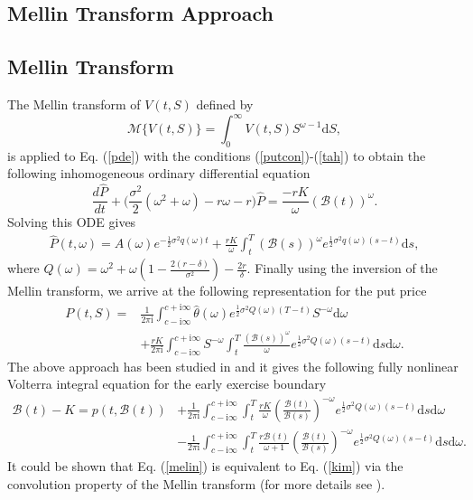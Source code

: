 \documentclass[fleqn,final,3p,11pt]{elsarticle}
\theoremstyle{definition}
\theoremstyle{remark}
\numberwithin{equation}{section}
\def\im{\mathrm{i}}
\begin{document}
\begin{appendices}
\section{Mellin Transform Approach}\label{melina}
\subsection{Mellin Transform}The Mellin transform of $V(t,S)$ defined by
\[\mathcal{M}\{V(t, S)\} = \int_{0}^{\infty} V(t, S)S^{\omega -1}\mathrm{d}S,\]
is applied to Eq. (\ref{pde}) with the conditions (\ref{putcon})-(\ref{tah}) to obtain the following inhomogeneous ordinary differential equation
\[
\frac{d\widehat{P}}{dt} + \Big( \frac{\sigma^2}{2}(\omega^{2}+\omega)-r\omega -r \Big)\widehat{P} = \frac{-rK}{\omega}(\mathcal{B}(t))^{\omega}.
\]
Solving this ODE gives
\begin{align*}
\widehat{P}(t, \omega) =A(\omega)e^{-\frac{1}{2}\sigma^{2}q(\omega)t} +\frac{rK}{\omega}\int_{t}^{T}(\mathcal{B}(s))^{\omega}e^{\frac{1}{2}\sigma^{2}q(\omega)(s-t)}\mathrm{d}s,
\end{align*}
where $Q(\omega) = \omega^{2} + \omega  \left( 1- \frac{2(r-\delta)}{\sigma^{2}}\right) - \frac{2r}{\delta}$.
Finally using the inversion of the Mellin transform, we arrive at the following representation for the  put price
\begin{align*}
P(t,S) =& \frac{1}{2\pi \im}\int_{c-\im \infty}^{c+\im \infty} \widehat{\theta}(\omega) e^{\frac{1}{2}\sigma^{2} Q(\omega)(T-t)} S^{-\omega}\mathrm{d}\omega \\
&+ \frac{rK}{2\pi \im}\int_{c-\im \infty}^{c+\im\infty} S^{-\omega} \int_{t}^{T}\frac{(\mathcal{B}(s))^{\omega}}{\omega}e^{\frac{1}{2}\sigma^{2}Q(\omega)(s-t)}\mathrm{d}s\mathrm{d}\omega.
\end{align*}
The above approach has been studied in \cite{frontczak2008pricing, panini} and it gives the following fully nonlinear Volterra integral equation for the early exercise boundary
\begin{equation}\label{melin}
\begin{split}
\mathcal{B}(t) - K  = p(t,\mathcal{B}(t)) & + \frac{1}{2\pi \im}\int_{c- \im \infty}^{c+\im \infty}\int_{t}^{T} \frac{r K}{\omega} \left(  \frac{\mathcal{B}(t)}{\mathcal{B}(s)} \right) ^{-\omega} e^{\frac{1}{2} \sigma^{2}Q(\omega)(s-t)} \mathrm{d}s \mathrm{d}\omega\\
& -  \frac{1}{2\pi \im}\int_{c-\im \infty}^{c+\im \infty}\int_{t}^{T} \frac{r \mathcal{B}(t)}{\omega +1} \left(  \frac{\mathcal{B}(t)}{\mathcal{B}(s)} \right) ^{-\omega} e^{\frac{1}{2} \sigma^{2}Q(\omega)(s-t)} \mathrm{d}s \mathrm{d}\omega.
\end{split}
\end{equation}
It could be shown that Eq. (\ref{melin}) is equivalent to Eq. (\ref{kim}) via the convolution property of the Mellin transform (for more details see \cite{frontczak2008pricing}).

\end{appendices}
\end{document}
